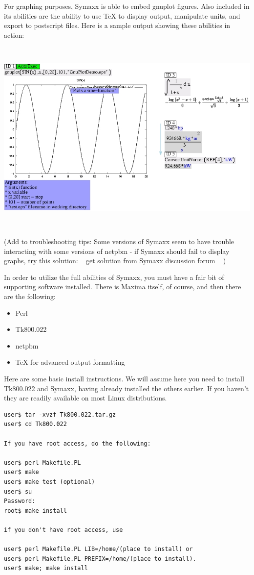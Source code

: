 For graphing purposes, Symaxx is able to embed gnuplot figures.  Also included
in its abilities are the ability to use TeX to display output, manipulate
units, and export to postscript files.  Here is a sample output showing
these abilities in action:

~

{\centering \includegraphics{images/symaxxoutput} \par}

~

(Add to
troubleshooting tips:  Some versions
of Symaxx seem to have trouble interacting with some versions of netpbm - if Symaxx
should fail to display graphs, try this solution:
~
get solution from Symaxx discussion forum
~
)

In order to utilize the full abilities of Symaxx, you must have a fair bit of
supporting software installed.  There is Maxima itself, of course, and then there
are the following:
\begin{itemize}
\item Perl
\item Tk800.022
\item netpbm
\item \TeX{} for advanced output formatting 
\end{itemize}

Here are some basic install instructions. We will assume here you need to install
Tk800.022 and Symaxx, having already installed the others earlier.  If you haven't
they are readily available on most Linux distributions.

\begin{verbatim}
user$ tar -xvzf Tk800.022.tar.gz 
user$ cd Tk800.022

If you have root access, do the following:

user$ perl Makefile.PL
user$ make
user$ make test (optional)
user$ su
Password:
root$ make install

if you don't have root access, use

user$ perl Makefile.PL LIB=/home/(place to install) or
user$ perl Makefile.PL PREFIX=/home/(place to install).
user$ make; make install
\end{verbatim}

